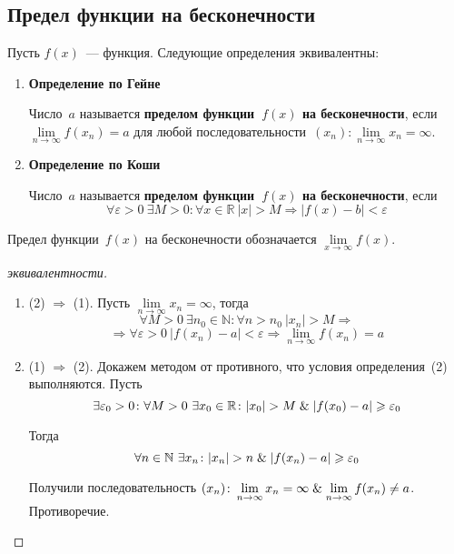 \subsection{Предел функции на бесконечности}
Пусть $f(x)$~--- функция.
Следующие определения эквивалентны:
\begin{enumerate}
	\item \textbf{Определение по Гейне}
	
	Число~$a$ называется \textbf{пределом функции~$f(x)$ на бесконечности}, если $\lim\limits_{n \to \infty} f(x_n) = a$ для любой последовательности~$(x_n) \colon \lim\limits_{n \to \infty} x_n = \infty$.
	
	\item \textbf{Определение по Коши}
	
	Число~$a$ называется \textbf{пределом функции~$f(x)$ на бесконечности}, если
	\begin{equation*}
	\forall \varepsilon > 0 \ \exists M > 0 \colon \forall x \in \mathbb R \ |x| > M \Rightarrow |f(x) - b| < \varepsilon
	\end{equation*}
\end{enumerate}

Предел функции~$f(x)$ на бесконечности обозначается $\lim\limits_{x \to \infty} f(x)$.
\begin{proof}[эквивалентности]
\begin{enumerate}
	\item (2) $\Rightarrow$ (1).
	Пусть $\lim\limits_{n \to \infty} x_n = \infty$, тогда
	\begin{equation*}
	\forall M > 0 \ \exists n_0 \in \mathbb N \colon \forall n > n_0 \ |x_n| > M \Rightarrow
	\end{equation*}
	\begin{equation*}
	\Rightarrow \forall \varepsilon > 0 \ |f(x_n) - a| < \varepsilon \Rightarrow
	\lim_{n \to \infty} f(x_n) = a
	\end{equation*}
	
	\item (1) $\Rightarrow$ (2).
	Докажем методом от противного, что условия определения~(2) выполняются.
	Пусть
	\begin{equation*}
	\exists \varepsilon_0 > 0 \colon \forall M > 0 \ \exists x_0 \in \mathbb R \colon |x_0| > M \mathrel{\&} |f(x_0) - a| \geqslant \varepsilon_0
	\end{equation*}
	
	Тогда
	\begin{equation*}
	\forall n \in \mathbb N \ \exists x_n \colon |x_n| > n \mathrel{\&} |f(x_n) - a| \geqslant \varepsilon_0
	\end{equation*}
	
	Получили последовательность $(x_n) \colon \lim\limits_{n \to \infty} x_n = \infty \mathrel{\&} \lim\limits_{n \to \infty} f(x_n) \neq a$.
	Противоречие.
\end{enumerate}
\end{proof}

